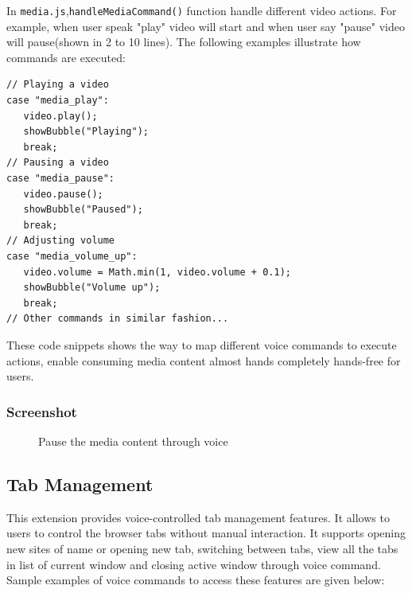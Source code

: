 In \texttt{media.js},\texttt{handleMediaCommand()} function handle different video actions. For example, when user speak "play" video will start and when user say "pause" video will pause(shown in 2 to 10 lines). The following examples illustrate how commands are executed:

\begin{verbatim}
// Playing a video
case "media_play":
   video.play();
   showBubble("Playing");
   break;
// Pausing a video
case "media_pause":
   video.pause();
   showBubble("Paused");
   break;
// Adjusting volume
case "media_volume_up":
   video.volume = Math.min(1, video.volume + 0.1);
   showBubble("Volume up");
   break;
// Other commands in similar fashion...
\end{verbatim}

These code snippets shows the way to map different voice commands 
to execute actions, enable consuming media content almost hands completely hands-free for users.
\subsubsection*{Screenshot}
\begin{figure}[htbp] 
    \centering
    \caption{ Pause the media content through voice}
    \label{fig:pause_media}
\end{figure}

\subsection{Tab Management}
This extension provides voice-controlled tab management features. It allows to users to control the browser tabs without manual interaction. It supports opening new sites of name or opening new tab, switching between tabs, view all the tabs in list of current window and closing active window through voice command. Sample examples of voice commands to access these features are given below:

